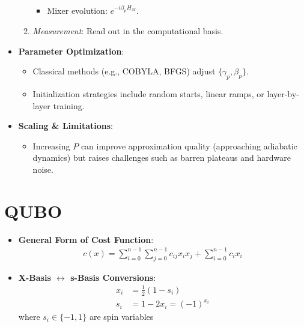 \begin{multicols}{3}
\begin{itemize}[leftmargin=*,nosep,topsep=0pt]
\begin{enumerate}[nosep]
\begin{itemize}[nosep]
                            \item Mixer evolution: \(e^{-i\beta_p H_M}\).
                          \end{itemize}
                        \item \textit{Measurement}: Read out in the computational basis.
                      \end{enumerate}
                    \item \textbf{Parameter Optimization}:
                      \begin{itemize}[nosep]
                        \item Classical methods (e.g., COBYLA, BFGS) adjust \(\{\gamma_p,\beta_p\}\).
                        \item Initialization strategies include random starts, linear ramps, or layer-by-layer training.
                      \end{itemize}
                    \item \textbf{Scaling \& Limitations}:
                      \begin{itemize}[nosep]
                        \item Increasing \(P\) can improve approximation quality (approaching adiabatic dynamics) but raises challenges such as barren plateaus and hardware noise.
                      \end{itemize}
                  \end{itemize}

                  \section*{QUBO}
                  \begin{itemize}[leftmargin=*,nosep,topsep=0pt]
                    \item \textbf{General Form of Cost Function}:
                      \begin{align*}
                        c(x) = \sum_{i = 0}^{n - 1} \sum_{j = 0}^{n - 1} c_{ij} x_i x_j + \sum_{i = 0}^{n - 1} c_i x_i
                      \end{align*}

                    \item \textbf{X-Basis $\leftrightarrow$ s-Basis Conversions}:
                      \begin{align*}
                        x_i &= \frac{1}{2}(1 - s_i)\\
                        s_i &= 1 - 2x_i = (-1)^{x_i}
                      \end{align*}
                      where $s_i \in \{-1,1\}$ are spin variables


\end{itemize}
\end{multicols}

